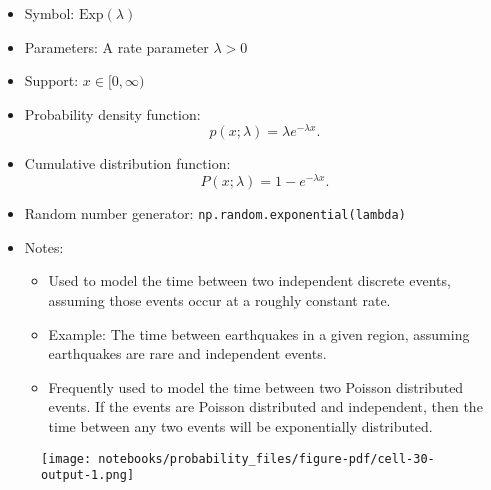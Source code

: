 \documentclass[
  letterpaper,
  DIV=11,
  numbers=noendperiod]{scrreprt}
\newenvironment{Shaded}{\begin{snugshade}}{\end{snugshade}}
\newcommand{\DecValTok}[1]{\textcolor[rgb]{0.68,0.00,0.00}{#1}}
\newcommand{\KeywordTok}[1]{\textcolor[rgb]{0.00,0.23,0.31}{#1}}
\newcommand{\NormalTok}[1]{\textcolor[rgb]{0.00,0.23,0.31}{#1}}
\newcommand{\OperatorTok}[1]{\textcolor[rgb]{0.37,0.37,0.37}{#1}}
\newcommand{\SpecialCharTok}[1]{\textcolor[rgb]{0.37,0.37,0.37}{#1}}
\newcommand{\SpecialStringTok}[1]{\textcolor[rgb]{0.13,0.47,0.30}{#1}}
\newcommand{\VariableTok}[1]{\textcolor[rgb]{0.07,0.07,0.07}{#1}}
\providecommand{\tightlist}{%
  \setlength{\itemsep}{0pt}\setlength{\parskip}{0pt}}\usepackage{longtable,booktabs,array}
\begin{document}
\begin{itemize}
\tightlist
\item
  Symbol: \(\text{Exp}(\lambda)\)
\item
  Parameters: A rate parameter \(\lambda > 0\)
\item
  Support: \(x \in [0,\infty)\)
\item
  Probability density function:
  \[p(x; \lambda) = \lambda e^{-\lambda x}.\]
\item
  Cumulative distribution function:
  \[P(x; \lambda) = 1 - e^{-\lambda x}.\]
\item
  Random number generator: \texttt{np.random.exponential(lambda)}
\item
  Notes:

  \begin{itemize}
  \tightlist
  \item
    Used to model the time between two independent discrete events,
    assuming those events occur at a roughly constant rate.
  \item
    Example: The time between earthquakes in a given region, assuming
    earthquakes are rare and independent events.
  \item
    Frequently used to model the time between two Poisson distributed
    events. If the events are Poisson distributed and independent, then
    the time between any two events will be exponentially distributed.
  \end{itemize}
\end{itemize}

\begin{Shaded}
\end{Shaded}

\begin{figure}[H]

{\centering \texttt{[image: notebooks/probability\_files/figure-pdf/cell-30-output-1.png]}

}

\end{figure}
\end{document}
